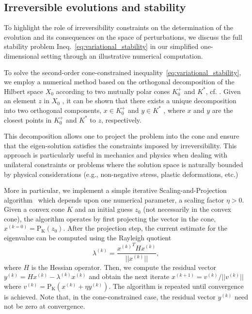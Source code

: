 \documentclass[10pt]{article}
\begin{document}
\subsection{Irreversible evolutions and stability}
To highlight the role of irreversibility constraints on the determination of the evolution and its consequences on the space of perturbations, we discuss the full stability problem Ineq.~\eqref{eq:variational_stability} in our simplified one-dimensional setting through an illustrative numerical computation. 

To solve the second-order cone-constrained inequality~\eqref{eq:variational_stability}, we employ a numerical method based on the orthogonal decomposition of the Hilbert space  $X_0$  according to two mutually polar cones  $K^+_0$  and  $K^*$, cf. \cite{Moreau1962-fz}. Given an element  $z$  in  $X_0$ , it can be shown that there exists a unique decomposition into two orthogonal components,  $x \in K^+_0$  and  $y \in K^*$ , where  $x$  and  $y$  are the closest points in  $K^+_0$  and  $K^*$  to  $z$, respectively.

This decomposition allows one to project the problem into the cone and ensure that the eigen-solution satisfies the constraints imposed by irreversibility. This approach is particularly useful in mechanics and physics when dealing with unilateral constraints or problems where the solution space is naturally bounded by physical considerations (e.g., non-negative stress, plastic deformations, etc.) 

More in particular, we implement a simple iterative Scaling-and-Projection algorithm~\cite{Pinto_da_Costa2010-qv} which depends upon one numerical parameter, a scaling factor $\eta>0$. Given a convex cone  $K$ and an initial guess $z_0$ (not necessarily in the convex cone), the algorithm operates by first projecting the vector in the cone, $x^{(k=0)}= \operatorname{P_K}(z_0)$.  
After the projection step, the current estimate for the eigenvalue can be computed using the Rayleigh quotient
\begin{equation}
    \lambda^{(k)} = \frac{{x^{(k)}}^T H x^{(k)}}{||x^{(k)}||},
\end{equation}
where $H$ is the Hessian operator. Then, we compute the residual vector $y^{(k)} = H x^{(k)} - \lambda^{(k)} x^{(k)}$ and obtain the next iterate $x^{(k+1)} = v^{(k)}/||v^{(k)}||$ where 
$v^{(k)} =\operatorname{P_K} (x^{(k)} + \eta y^{(k)})$.
The algorithm is repeated until convergence is achieved. Note that, in the cone-constrained case, the residual vector $y^{(k)}$ need not be zero at convergence.
\end{document}
